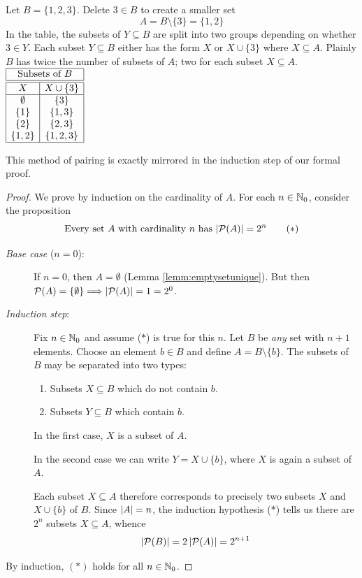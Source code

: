 \begin{example}[lower separated=false, sidebyside, sidebyside align=top seam, sidebyside gap=0pt, righthand width=0.2\linewidth]{}{}
	Let $B=\{1,2,3\}$. Delete $3\in B$ to create a smaller set
	\[
		A=B\setminus\{3\}=\{1,2\}
	\]
	In the table, the subsets of $Y\subseteq B$ are split into two groups depending on whether $3\in Y$. Each subset $Y\subseteq B$ either has the form $X$ or $X\cup\{3\}$ where $X\subseteq A$.\smallbreak
	Plainly $B$ has twice the number of subsets of $A$; two for each subset $X\subseteq A$.
	\tcblower
	\hfill
	$\begin{array}{|c|c|}
		\hline
		\multicolumn{2}{|c|}{\text{Subsets of $B$}}\\\hline\hline
 		X&X\cup\{3\}\\\hline
 		\emptyset&\{3\}\\
 		\{1\}&\{1,3\}\\
 		\{2\}&\{2,3\}\\
 		\{1,2\}&\{1,2,3\}\\\hline
	\end{array}$
\end{example}


This method of pairing is exactly mirrored in the induction step of our formal proof.

\begin{proof}
 	We prove by induction on the cardinality of $A$. For each $n\in\mathbb{N}_0$, consider the proposition
	\[
		\text{Every set $A$ with cardinality $n$ has $\left| \mathcal{P}(A)\right|=2^n$}\tag{$\ast$}
	\]
	\begin{description}
		\item[\normalfont\emph{Base case} ($n=0$):] If $n=0$, then $A=\emptyset$ (Lemma \ref{lemm:emptysetunique}). But then $\mathcal{P}(A)=\{\emptyset\}\Longrightarrow\left| \mathcal{P}(A)\right|=1=2^0$.
		\item[\normalfont\emph{Induction step}:] Fix $n\in\mathbb{N}_0$ and assume ($\ast$) is true for this $n$. Let $B$ be \emph{any} set with $n+1$ elements. Choose an element $b\in B$ and define $A=B\setminus\{b\}$. The subsets of $B$ may be separated into two types:
	\begin{enumerate}
	  \item Subsets $X\subseteq B$ which do not contain $b$.
	  \item Subsets $Y\subseteq B$ which contain $b$.
	\end{enumerate}
	In the first case, $X$ is a subset of $A$.\par
	In the second case we can write $Y=X\cup\{b\}$, where $X$ is again a subset of $A$.\par
	Each subset $X\subseteq A$ therefore corresponds to precisely two subsets $X$ and $X\cup\{b\}$ of $B$. Since $\left| A\right|=n$, the induction hypothesis ($\ast$) tells us there are $2^n$ subsets $X\subseteq A$, whence
	\[
		\left| \mathcal{P}(B)\right|=2\left| \mathcal{P}(A)\right|=2^{n+1}
	\]
	\end{description}
	By induction, $(\ast)$ holds for all $n\in\mathbb{N}_0$.
\end{proof}

